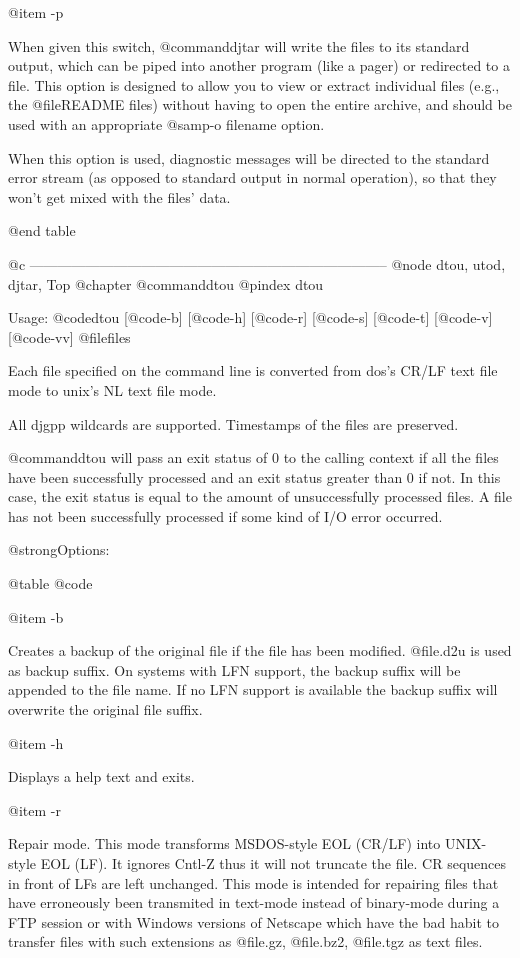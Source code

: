 @item -p

When given this switch, @command{djtar} will write the files to its standard
output, which can be piped into another program (like a pager) or
redirected to a file.  This option is designed to allow you to view or
extract individual files (e.g., the @file{README} files) without having to
open the entire archive, and should be used with an appropriate @samp{-o
filename} option.

When this option is used, diagnostic messages will be directed to the
standard error stream (as opposed to standard output in normal operation),
so that they won't get mixed with the files' data.

@end table

@c -----------------------------------------------------------------------------
@node dtou, utod, djtar, Top
@chapter @command{dtou}
@pindex dtou

Usage: @code{dtou} [@code{-b}] [@code{-h}] [@code{-r}] [@code{-s}] [@code{-t}]
[@code{-v}] [@code{-vv}] @file{files}

Each file specified on the command line is converted from dos's CR/LF
text file mode to unix's NL text file mode.

All djgpp wildcards are supported.  Timestamps of the files are preserved.

@command{dtou} will pass an exit status of 0 to the calling context if all the
files have been successfully processed and an exit status greater than 0 if
not.  In this case, the exit status is equal to the amount of unsuccessfully
processed files.  A file has not been successfully processed if some kind of
I/O error occurred.

@strong{Options:}

@table @code

@item -b

Creates a backup of the original file if the file has been modified.
@file{.d2u} is used as backup suffix.  On systems with LFN support, the
backup suffix will be appended to the file name.  If no LFN support is
available the backup suffix will overwrite the original file suffix.

@item -h

Displays a help text and exits.

@item -r

Repair mode.  This mode transforms MSDOS-style EOL (CR/LF) into
UNIX-style EOL (LF).  It ignores Cntl-Z thus it will not truncate the file.
CR sequences in front of LFs are left unchanged.  This mode is intended
for repairing files that have erroneously been transmited in text-mode
instead of binary-mode during a FTP session or with Windows versions of
Netscape which have the bad habit to transfer files with such extensions
as @file{.gz}, @file{.bz2}, @file{.tgz} as text files.


